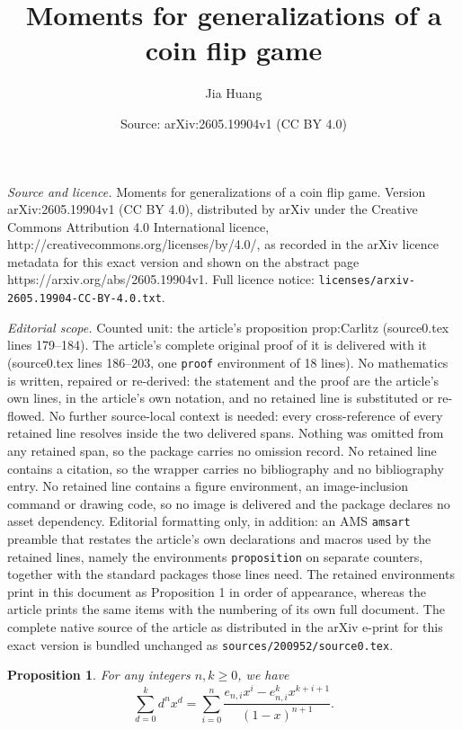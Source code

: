 \documentclass[10pt,a4paper]{amsart}
\title{Moments for generalizations of a coin flip game}
\author{Jia Huang}
\date{Source: arXiv:2605.19904v1 (CC BY 4.0)}
\newtheorem{proposition}{Proposition}
\begin{document}
\maketitle

\noindent\emph{Source and licence.} Moments for generalizations of a coin flip game. Version arXiv:2605.19904v1 (CC BY 4.0), distributed by arXiv under the Creative Commons Attribution 4.0 International licence, http://creativecommons.org/licenses/by/4.0/, as recorded in the arXiv licence metadata for this exact version and shown on the abstract page https://arxiv.org/abs/2605.19904v1. Full licence notice: \texttt{licenses/arxiv-2605.19904-CC-BY-4.0.txt}.\par\smallskip

\noindent\textit{Editorial scope.} Counted unit: the article's proposition prop:Carlitz (source0.tex lines 179--184). The article's complete original proof of it is delivered with it (source0.tex lines 186--203, one \texttt{proof} environment of 18 lines). No mathematics is written, repaired or re-derived: the statement and the proof are the article's own lines, in the article's own notation, and no retained line is substituted or re-flowed.  No further source-local context is needed: every cross-reference of every retained line resolves inside the two delivered spans.  Nothing was omitted from any retained span, so the package carries no omission record.  No retained line contains a citation, so the wrapper carries no bibliography and no bibliography entry.  No retained line contains a figure environment, an image-inclusion command or drawing code, so no image is delivered and the package declares no asset dependency.  Editorial formatting only, in addition: an AMS \texttt{amsart} preamble that restates the article's own declarations and macros used by the retained lines, namely the environments \texttt{proposition} on separate counters, together with the standard packages those lines need.  The retained environments print in this document as Proposition 1 in order of appearance, whereas the article prints the same items with the numbering of its own full document.  The complete native source of the article as distributed in the arXiv e-print for this exact version is bundled unchanged as \texttt{sources/200952/source0.tex}.
\begin{proposition}\label{prop:Carlitz}
For any integers $n,k\ge0$, we have
\[ 
\sum_{d=0}^k d^n x^d = \sum_{i=0}^n \frac{e_{n,i} x^i - e_{n,i}^k x^{k+i+1}}{(1-x)^{n+1}}.
\]
\end{proposition}
\end{document}
